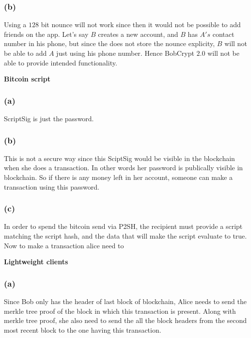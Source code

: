 \documentclass[a4paper]{article}
\begin{document}
\subsubsection*{(b)}
Using a $128$ bit nounce will not work since then it would not be possible to add friends on the app.
Let's say $B$ creates a new account, and $B$ has $A's$ contact number in his phone, but since the
does not store the nounce explicity, $B$ will not be able to add $A$ just using his phone number. Hence
BobCrypt $2.0$ will not be able to provide intended functionality.

\begin{question}
    \textbf{Bitcoin script}
\end{question}
\subsubsection*{(a)}
ScriptSig is just the password.

\subsubsection*{(b)}
This is not a secure way since this SciptSig would be visible in the blockchain when she does a transaction.
In other words her password is publically visible in blockchain. So if there is any money left
in her account, someone can make a transaction using this password.

\subsubsection*{(c)}
In order to spend the bitcoin send via P2SH, the recipient must provide a script matching the script hash,
and the data that will make the script evaluate to true. Now to make a transaction alice need to 


\begin{question}
    \textbf{Lightweight clients}
\end{question}

\subsubsection*{(a)}
Since Bob only has the header of last block of blockchain, Alice needs to send the merkle tree proof 
of the block in which this transaction is present. Along with merkle tree proof, she also need to 
send the all the block headers from the second most recent block to the one having this transaction. \\
\end{document}
